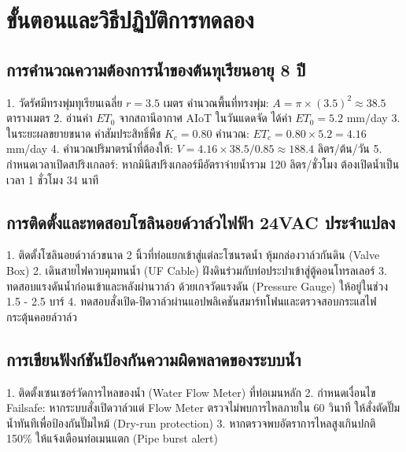 \section{ขั้นตอนและวิธีปฏิบัติการทดลอง}

\subsection{การคำนวณความต้องการน้ำของต้นทุเรียนอายุ 8 ปี}
\begin{sensorbox}
1. วัดรัศมีทรงพุ่มทุเรียนเฉลี่ย $r = 3.5$ เมตร คำนวณพื้นที่ทรงพุ่ม: $A = \pi \times (3.5)^2 \approx 38.5$ ตารางเมตร
2. อ่านค่า $ET_0$ จากสถานีอากาศ AIoT ในวันแดดจัด ได้ค่า $ET_0 = 5.2$ mm/day
3. ในระยะผลขยายขนาด ค่าสัมประสิทธิ์พืช $K_c = 0.80$ คำนวณ: $ET_c = 0.80 \times 5.2 = 4.16$ mm/day
4. คำนวณปริมาตรน้ำที่ต้องให้: $V = 4.16 \times 38.5 / 0.85 \approx 188.4$ ลิตร/ต้น/วัน
5. กำหนดเวลาเปิดสปริงเกลอร์: หากมินิสปริงเกลอร์มีอัตราจ่ายน้ำรวม 120 ลิตร/ชั่วโมง ต้องเปิดน้ำเป็นเวลา 1 ชั่วโมง 34 นาที
\end{sensorbox}

\subsection{การติดตั้งและทดสอบโซลินอยด์วาล์วไฟฟ้า 24VAC ประจำแปลง}
\begin{sensorbox}
1. ติดตั้งโซลินอยด์วาล์วขนาด 2 นิ้วที่ท่อแยกเข้าสู่แต่ละโซนรดน้ำ หุ้มกล่องวาล์วกันดิน (Valve Box)
2. เดินสายไฟควบคุมทนน้ำ (UF Cable) ฝังดินร่วมกับท่อประปาเข้าสู่ตู้คอนโทรลเลอร์
3. ทดสอบแรงดันน้ำก่อนเข้าและหลังผ่านวาล์ว ด้วยเกจวัดแรงดัน (Pressure Gauge) ให้อยู่ในช่วง 1.5 - 2.5 บาร์
4. ทดสอบสั่งเปิด-ปิดวาล์วผ่านแอปพลิเคชันสมาร์ทโฟนและตรวจสอบกระแสไฟกระตุ้นคอยล์วาล์ว
\end{sensorbox}

\subsection{การเขียนฟังก์ชันป้องกันความผิดพลาดของระบบน้ำ}
\begin{sensorbox}
1. ติดตั้งเซนเซอร์วัดการไหลของน้ำ (Water Flow Meter) ที่ท่อเมนหลัก
2. กำหนดเงื่อนไข Failsafe: หากระบบสั่งเปิดวาล์วแต่ Flow Meter ตรวจไม่พบการไหลภายใน 60 วินาที ให้สั่งตัดปั๊มน้ำทันทีเพื่อป้องกันปั๊มไหม้ (Dry-run protection)
3. หากตรวจพบอัตราการไหลสูงเกินปกติ 150\% ให้แจ้งเตือนท่อเมนแตก (Pipe burst alert)
\end{sensorbox}

